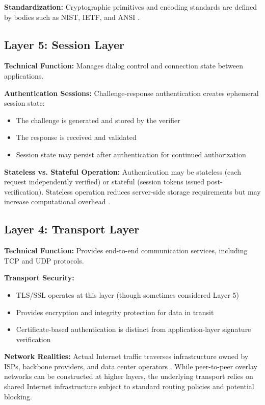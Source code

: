 \documentclass[11pt,a4paper]{article}
\begin{document}
\textbf{Standardization:}
Cryptographic primitives and encoding standards are defined by bodies such as NIST, IETF, and ANSI \citep{nist2023, rfc8032}.

\subsection{Layer 5: Session Layer}

\textbf{Technical Function:} Manages dialog control and connection state between applications.

\textbf{Authentication Sessions:}
Challenge-response authentication creates ephemeral session state:
\begin{itemize}[leftmargin=*]
    \item The challenge is generated and stored by the verifier
    \item The response is received and validated
    \item Session state may persist after authentication for continued authorization
\end{itemize}

\textbf{Stateless vs. Stateful Operation:}
Authentication may be stateless (each request independently verified) or stateful (session tokens issued post-verification). Stateless operation reduces server-side storage requirements but may increase computational overhead \citep{rfc7230}.

\subsection{Layer 4: Transport Layer}

\textbf{Technical Function:} Provides end-to-end communication services, including TCP and UDP protocols.

\textbf{Transport Security:}
\begin{itemize}[leftmargin=*]
    \item TLS/SSL operates at this layer (though sometimes considered Layer 5)
    \item Provides encryption and integrity protection for data in transit
    \item Certificate-based authentication is distinct from application-layer signature verification
\end{itemize}

\textbf{Network Realities:}
Actual Internet traffic traverses infrastructure owned by ISPs, backbone providers, and data center operators \citep{gill2015}. While peer-to-peer overlay networks can be constructed at higher layers, the underlying transport relies on shared Internet infrastructure subject to standard routing policies and potential blocking.
\end{document}
